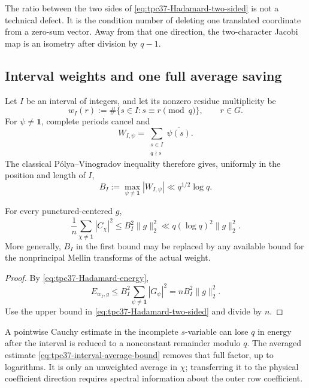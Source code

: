 The ratio between the two sides of
\eqref{eq:tpc37-Hadamard-two-sided} is not a technical defect.  It is the
condition number of deleting one translated coordinate from a zero-sum
vector.  Away from that one direction, the two-character Jacobi map is
an isometry after division by \(q-1\).

\subsection{Interval weights and one full average saving}

Let \(I\) be an interval of integers, and let its nonzero residue
multiplicity be
\begin{equation}
 w_I(r):=\#\{s\in I:s\equiv r\pmod q\},
 \qquad r\in G.
 \label{eq:tpc37-interval-residue-weight}
\end{equation}
For \(\psi\ne\mathbf1\), complete periods cancel and
\begin{equation}
 W_{I,\psi}
 =\sum_{\substack{s\in I\\q\nmid s}}
 \overline{\psi(s)}.
 \label{eq:tpc37-interval-character-sum}
\end{equation}
The classical P\'olya--Vinogradov inequality
\citep[Chapter~9]{MontgomeryVaughan2007} therefore gives, uniformly in
the position and length of \(I\),
\begin{equation}
 B_I:=\max_{\psi\ne\mathbf1}|W_{I,\psi}|
 \ll q^{1/2}\log q.
 \label{eq:tpc37-PV}
\end{equation}

\begin{corollary}
\label{cor:tpc37-interval-average}
For every punctured-centered \(g\),
\begin{equation}
 \boxed{
 \frac1n\sum_{\chi\ne\mathbf1}|C_\chi|^2
 \le B_I^2\|g\|_2^2
 \ll q(\log q)^2\|g\|_2^2.}
 \label{eq:tpc37-interval-average-bound}
\end{equation}
More generally, \(B_I\) in the first bound may be replaced by any
available bound for the nonprincipal Mellin transforms of the actual
weight.
\end{corollary}

\begin{proof}
By \eqref{eq:tpc37-Hadamard-energy},
\[
 E_{w_I,g}
 \le B_I^2\sum_{\psi\ne\mathbf1}|G_\psi|^2
 =nB_I^2\|g\|_2^2.
\]
Use the upper bound in \eqref{eq:tpc37-Hadamard-two-sided} and divide by
\(n\).
\end{proof}

A pointwise Cauchy estimate in the incomplete \(s\)-variable can lose
\(q\) in energy after the interval is reduced to a nonconstant remainder
modulo \(q\).  The averaged estimate
\eqref{eq:tpc37-interval-average-bound} removes that full factor, up to
logarithms.  It is only an unweighted average in \(\chi\); transferring
it to the physical coefficient direction requires spectral information
about the outer row coefficient.

